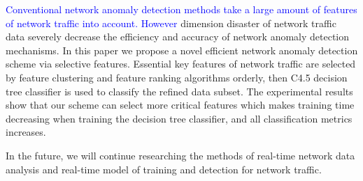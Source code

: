 \documentclass{ieeeaccess}
\theoremstyle{definition}
\newcommand{\change}[2]{\textcolor{red}{#1}\textcolor{blue}{#2}}
\begin{document}
\change{}{Conventional network anomaly detection methods take a large amount of features of network traffic into account. However} dimension disaster of network traffic data severely decrease the efficiency and accuracy of network anomaly detection mechanisms. In this paper we propose a novel efficient network anomaly detection scheme via selective features. 
Essential key features of network traffic are selected by feature clustering and feature ranking algorithms orderly, then C4.5 decision tree classifier is used to classify the refined data subset. 
The experimental results show that our scheme can select more critical features which makes training time decreasing when training the decision tree classifier, and all classification metrics increases. 

In the future, we will continue researching the methods of real-time network data analysis and real-time model of training and detection for network traffic.
\end{document}
